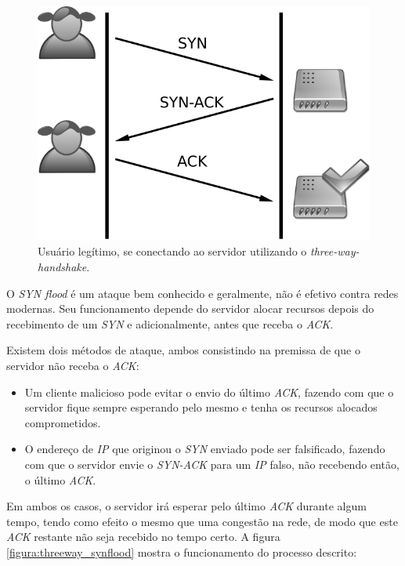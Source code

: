 \begin{figure}[H]
    \begin{center}
        \includegraphics[scale=0.6]{./figuras/Tcp_normal-GS.png}

        \caption{\label{figura:threeway}Usuário legítimo, se conectando ao servidor utilizando o \textit{three-way-handshake}.}
    \end{center}
\end{figure}

O \textit{SYN flood} é um ataque bem conhecido e geralmente, não é efetivo contra redes modernas. Seu funcionamento depende do servidor alocar recursos depois do recebimento de um \textit{SYN} e adicionalmente, antes que receba o \textit{ACK}.

Existem dois métodos de ataque, ambos consistindo na premissa de que o servidor não receba o \textit{ACK}:
\begin{itemize}
    \item Um cliente malicioso pode evitar o envio do último \textit{ACK}, fazendo com que o servidor fique sempre esperando pelo mesmo e tenha os recursos alocados comprometidos.

    \item O endereço de \textit{IP} que originou o \textit{SYN} enviado pode ser falsificado, fazendo com que o servidor envie o \textit{SYN-ACK} para um \textit{IP} falso, não recebendo então, o último \textit{ACK}.
\end{itemize}

Em ambos os casos, o servidor irá esperar pelo último \textit{ACK} durante algum tempo, tendo como efeito o mesmo que uma congestão na rede, de modo que este \textit{ACK} restante não seja recebido no tempo certo. A figura \ref{figura:threeway_synflood} mostra o funcionamento do processo descrito:

